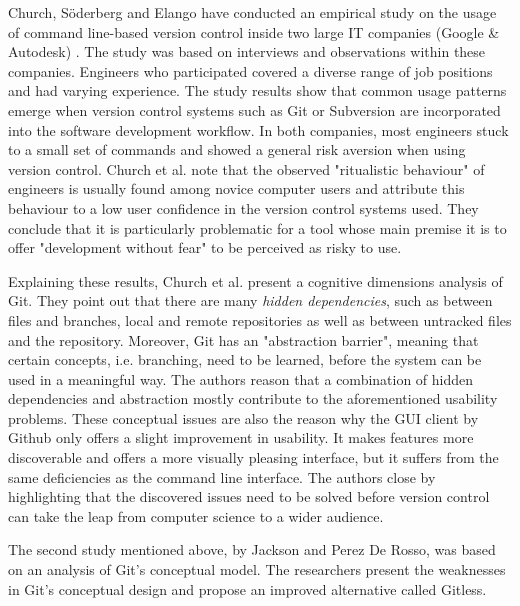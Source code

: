 Church, Söderberg and Elango have conducted an empirical study on the usage of command line-based version control inside two large IT companies (Google \& Autodesk) \cite{church_case_2014}. The study was based on interviews and observations within these companies. Engineers who participated covered a diverse range of job positions and had varying experience. The study results show that common usage patterns emerge when version control systems such as Git or Subversion are incorporated into the software development workflow. In both companies, most engineers stuck to a small set of commands and showed a general risk aversion when using version control. Church et al. note that the observed "ritualistic behaviour" of engineers is usually found among novice computer users and attribute this behaviour to a low user confidence in the version control systems used. They conclude that it is particularly problematic for a tool whose main premise it is to offer "development without fear" to be perceived as risky to use.

Explaining these results, Church et al. present a cognitive dimensions analysis of Git. They point out that there are many \textit{hidden dependencies}, such as between files and branches, local and remote repositories as well as between untracked files and the repository. Moreover, Git has an "abstraction barrier", meaning that certain concepts, i.e. branching, need to be learned, before the system can be used in a meaningful way. The authors reason that a combination of hidden dependencies and abstraction mostly contribute to the aforementioned usability problems. These conceptual issues are also the reason why the \ac{GUI} client by Github \cite{_github_????} only offers a slight improvement in usability. It makes features more discoverable and offers a more visually pleasing interface, but it suffers from the same deficiencies as the command line interface. The authors close by highlighting that the discovered issues need to be solved before version control can take the leap from computer science to a wider audience.

The second study mentioned above, by Jackson and Perez De Rosso, was based on an analysis of Git's conceptual model. The researchers present the weaknesses in Git's conceptual design and propose an improved alternative called Gitless.

